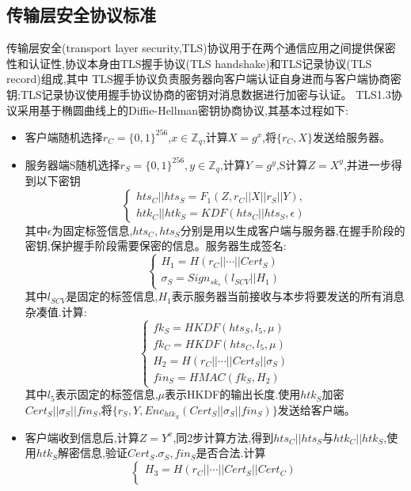 \subsection{传输层安全协议标准}
传输层安全(transport layer security,TLS)协议用于在两个通信应用之间提供保密性和认证性,协议本身由TLS握手协议(TLS handshake)和TLS记录协议(TLS record)组成,其中
TLS握手协议负责服务器向客户端认证自身进而与客户端协商密钥;TLS记录协议使用握手协议协商的密钥对消息数据进行加密与认证。
TLS1.3协议采用基于椭圆曲线上的Diffie-Hellman密钥协商协议,其基本过程如下:
\begin{itemize}
    \item [1.]客户端随机选择$r_C = \{0,1\}^{256}$,$x \in \mathbb{Z}_q$,计算$X = g^x$,将$\{  r_C , X\}$发送给服务器。
    \item [2.]服务器端S随机选择$r_S = \{  0,1 \}^{256}, y \in \mathbb{Z}_q$,计算$Y = g^y$,S计算$Z = X^y$,并进一步得到以下密钥
    \[
    \begin{cases}
        hts_C || hts_S = F_1(Z,r_C||X||r_S||Y),\\
        htk_C || htk_S = KDF(hts_C || hts_S,\epsilon)
    \end{cases}
    \]
    其中$\epsilon$为固定标签信息,$hts_C,hts_S$分别是用以生成客户端与服务器,在握手阶段的密钥,保护握手阶段需要保密的信息。服务器生成签名:
    \[
    \begin{cases}
        H_1 = H(r_C|| \cdots  ||Cert_S)\\
        \sigma_S = Sign_{sk_s}(l_{SCV}||H_1)
    \end{cases}
    \]
    其中$l_{SCV}$是固定的标签信息,$H_1$表示服务器当前接收与本步将要发送的所有消息杂凑值.计算:
    \[
        \begin{cases}
            fk_S = HKDF(hts_S,l_5,\mu)\\
            fk_C = HKDF(hts_C,l_5,\mu)\\
            H_2 = H(r_C || \cdots || Cert_S||\sigma_S)\\
            fin_S = HMAC(fk_S,H_2)
        \end{cases}
    \]
    其中$l_5$表示固定的标签信息,$\mu$表示HKDF的输出长度.使用$htk_S$加密$Cert_S||\sigma_S||fin_S$,将$\{ r_S,Y,Enc_{htk_S}(Cert_S || \sigma_S || fin_S)  \}$发送给客户端。
    \item [3.]客户端收到信息后,计算$Z = Y^x$,同2步计算方法,得到$hts_C || hts_S$与$htk_C || htk_S$,使用$htk_S$解密信息,验证$Cert_S.\sigma_S,fin_S$是否合法.计算
    \[
    \begin{cases}
        H_3 = H(r_C || \cdots || Cert_S || Cert_C)\\

\end{cases}\]
\end{itemize}
